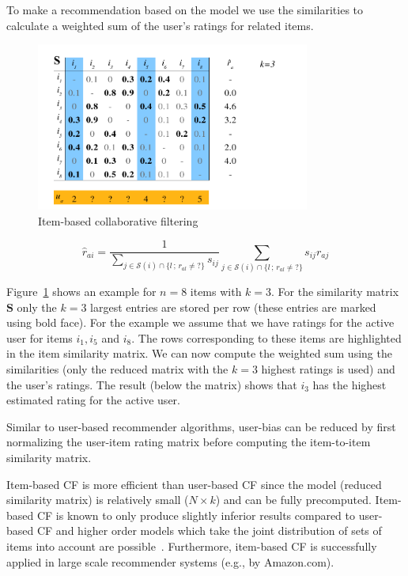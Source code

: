 \documentclass[nojss]{jss}
\newcommand{\set}[1]{\mathcal{#1}}
\newcommand{\mat}[1]{{\mathbf{#1}}}
\begin{document}
To make a recommendation based on the model 
we use the similarities to calculate a weighted sum of the user's ratings
for related items.



\begin{figure}
\centerline{\includegraphics[width=9cm]{item-based2}}
\caption{Item-based collaborative filtering}
\label{fig:IBCF}
\end{figure}

\begin{equation}
    \hat{r}_{ai} =  \frac{1}{\sum_{j \in \set{S}(i)\cap \{l\,;\,r_{al} \ne ?\}}{s_{ij}}} 
    \sum_{j \in \set{S}(i)\cap \{l\,;\,r_{al} \ne ?\}}{s_{ij} r_{aj}}
\end{equation}


Figure~\ref{fig:IBCF} shows an example for $n=8$ items with $k=3$. For the 
similarity matrix $\mat{S}$ only the $k=3$ largest entries are
stored per row (these entries are marked using bold face).
For the example we assume that we have ratings for the  
active user for items
$i_1, i_5$ and $i_8$. The rows corresponding to these items are highlighted
in the item similarity matrix. We can now compute the weighted sum using
the similarities (only the reduced matrix with the $k=3$
highest ratings is used) and the user's ratings. 
The result (below the matrix) shows that $i_3$ has the highest estimated
rating for the active user. 

Similar to user-based recommender algorithms, user-bias can be reduced
by first normalizing the user-item rating matrix before computing the 
item-to-item similarity matrix.


Item-based CF is more efficient than user-based CF since the
model (reduced similarity matrix) is relatively small ($N \times k$) and
can be fully precomputed. Item-based CF is known to 
only produce slightly inferior results compared to user-based 
CF and higher order models 
which take the joint distribution of
sets of items into account 
are possible~\citep{recommender:Deshpande:2004}.
Furthermore, item-based CF is successfully applied 
in large scale recommender systems (e.g., by Amazon.com).
\end{document}
